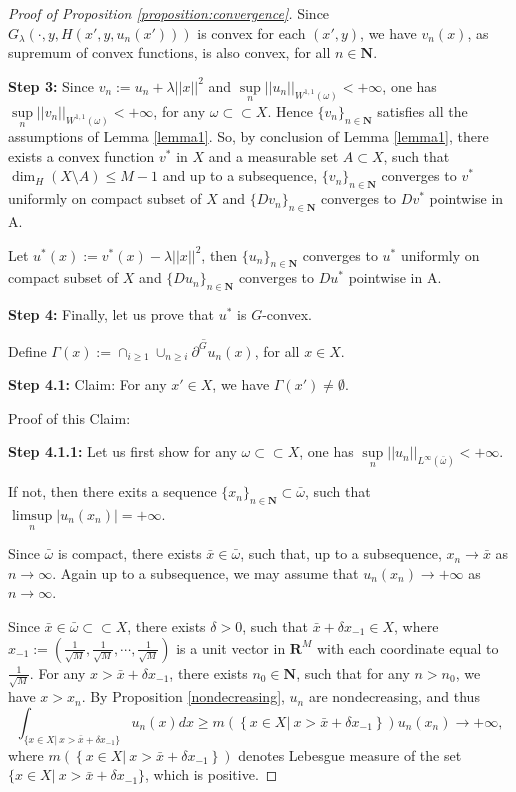 \documentclass[a4paper, 11pt]{amsart}
\numberwithin{equation}{section}
\theoremstyle{plain}
\theoremstyle{definition}
\theoremstyle{remark}
\newcommand{\R}{\mathbf{R}}
\newcommand{\N}{\mathbf{N}}
\begin{document}
\begin{proof}[Proof of Proposition \ref{proposition:convergence}]
	
	Since $G_{\lambda}(\cdot,y,H(x',y,u_n(x')))$ is convex for each $(x', y)$, we have $v_n(x)$, as supremum of convex functions, is also convex, for all $n \in \N$.\medskip
	
	
	
{\bf Step 3:}	Since $v_n:= u_n +\lambda||x||^2$ and $\sup\limits_{n}||u_n||_{W^{1,1}(\omega)} < +\infty$, one has $\sup\limits_{n}||v_n||_{W^{1,1}(\omega)} < +\infty$, for any $\omega \subset \subset X$. Hence $\{v_n\}_{n\in \N}$ satisfies all the assumptions of Lemma \ref{lemma1}. So, by conclusion of Lemma \ref{lemma1}, there exists a convex function $v^*$ in $X$ and a measurable set $A \subset X$, such that $\dim_{H} (X \setminus A)\le M-1$ and up to a subsequence, $\{v_n\}_{n\in \N}$ converges to $v^*$ uniformly on compact subset of $X$ and $\{D v_n\}_{n\in \N}$ converges to $D v^*$ pointwise in A.
	
	Let $u^*(x):=v^*(x)-\lambda||x||^2$, then  $\{u_n\}_{n\in \N}$ converges to $u^*$ uniformly on compact subset of $X$ and $\{D u_n\}_{n\in \N}$ converges to $D u^*$ pointwise in A.\medskip
	
{\bf Step 4:}	Finally, let us prove that $u^*$ is $G$-convex.\medskip

	Define $\Gamma(x):=\cap_{i\ge 1}\overline{\cup_{n\ge i}\partial^G u_n(x)}$, for all $x\in X$.\medskip
	
	
{\bf	Step 4.1:} Claim: For any $x'\in X$, we have $\Gamma(x') \neq \emptyset$.\medskip
	
	Proof of this Claim: 
	
	{\bf Step 4.1.1:} Let us first show for any $\omega \subset\subset X$, one has $\sup\limits_{n}||u_n||_{L^{\infty}(\bar{\omega})}<+\infty$.
	
	If not, then there exits a sequence $\{x_n\}_{n\in \N}\subset \bar{\omega}$, such that $\limsup\limits_{n}|u_n(x_n)|=+\infty$.
	
	Since $\bar{\omega}$ is compact, there exists $\bar{x}\in \bar{\omega}$, such that, up to a subsequence, $x_n\longrightarrow \bar{x}$ as $n \longrightarrow \infty$. Again up to a subsequence, we may assume that $u_n(x_n)\longrightarrow +\infty$ as $n \longrightarrow \infty$.
	
	Since $\bar{x} \in \bar{\omega} \subset \subset X$, there exists $\delta >0$, such that $\bar{x}+\delta x_{-1} \in X$, where $x_{-1}:=(\frac{1}{\sqrt{M}}, \frac{1}{\sqrt{M}}, \cdots, \frac{1}{\sqrt{M}})$ is a unit vector in $\R^M$ with each coordinate equal to $\frac{1}{\sqrt{M}}$. For any $x>\bar{x} + \delta x_{-1}$, there exists $n_0\in \N$, such that for any $n>n_0$, we have $x>x_n$. By Proposition \ref{nondecreasing}, $u_n$ are nondecreasing, and thus
	\begin{equation}\label{eqn_integral}
	\int_{\{x\in X|~ x>\bar{x} +\delta x_{-1}\}} u_n(x)dx \ge m\left(\left\{x\in X|~ x> \bar{x}+\delta x_{-1}\right\}\right) u_n(x_n)\longrightarrow +\infty,
	\end{equation}
	where $m\left(\left\{x\in X|~ x>\bar{x}+\delta x_{-1}\right\}\right)$ denotes Lebesgue measure of the set $\{x\in X|~ x>\bar{x}+\delta x_{-1}\}$, which is positive.
	

\end{proof}
\end{document}
